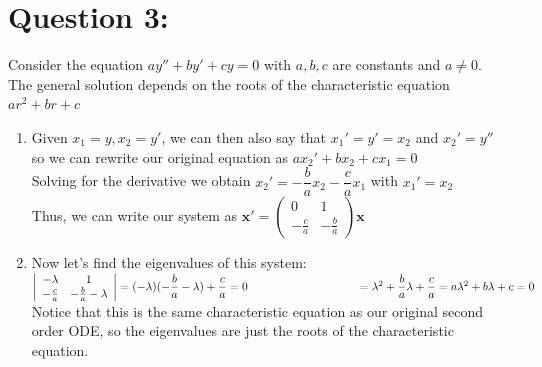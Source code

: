 \documentclass[12pt]{article}
\begin{document}
\vspace{10cm}

\section*{Question 3:}
Consider the equation $ay'' + by' + cy = 0$ with $a, b, c$ are constants and $a \neq 0$. \\
The general solution depends on the roots of the characteristic equation $ar^2+br+c$
\begin{enumerate}
    \item[a)] Given $x_1 = y, x_2 = y'$, we can then also say that $x_1' = y' = x_2$ and $x_2' = y''$ \\
            so we can rewrite our original equation as $ax_2' + bx_2 + cx_1 = 0$ \\
            Solving for the derivative we obtain $x_2' = -\dfrac{b}{a}x_2 - \dfrac{c}{a}x_1$ with $x_1'=x_2$ \\
            Thus, we can write our system as $\mathbf{x'} = \begin{pmatrix} 0 & 1 \\ -\frac{c}{a} & -\frac{b}{a} \end{pmatrix}\mathbf{x}$ \\

    \item[b)] Now let's find the eigenvalues of this system: \\
            $\left| \begin{array}{cc} -\lambda & 1 \\ -\frac{c}{a} & -\frac{b}{a} - \lambda\end{array}\right| 
            = (-\lambda)(-\dfrac{b}{a} - \lambda) + \dfrac{c}{a} = 0 \\\\
            \hspace*{95pt} = \lambda^2 + \dfrac{b}{a}\lambda + \dfrac{c}{a} = a\lambda^2 +b\lambda + c = 0$\\
            Notice that this is the same characteristic equation as our original second order ODE, so the eigenvalues are just the roots of the characteristic equation. \\
\end{enumerate}

\vspace{20cm
}
\end{document}
